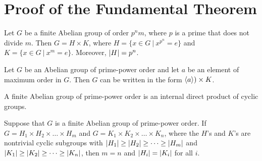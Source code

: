 \section{Proof of the Fundamental Theorem}

\begin{lemma}
	Let $G$ be a finite Abelian group of order $p^nm$, where $p$ is a prime that does not divide $m$. Then $G = H \times K$, where $H = \{x \in G\ \vert\ x^{p^n} =e\}$ and $K =\{x \in G\ \vert\ x^m = e\}$. Moreover, $\left\lvert H \right\rvert=p^n$.
\end{lemma}

\begin{lemma}
	Let $G$ be an Abelian group of prime-power order and let $a$ be an element of maximum order in $G$. Then $G$ can be written in the form $\langle a \rangle) \times K$.
\end{lemma}

\begin{lemma}
	A finite Abelian group of prime-power order is an internal direct product of cyclic groups.
\end{lemma}

\begin{lemma}
	Suppose that $G$ is a finite Abelian group of prime-power order. If $G=H_1 \times H_2 \times \dots \times H_m$ and $G=K_1 \times K_2 \times \dots \times K_n$, where the $H$'s and $K$'s are nontrivial cyclic subgroups with $\left\lvert H_1 \right\rvert \geq \left\lvert H_2 \right\rvert \geq \dots \geq \left\lvert H_m \right\rvert$ and $\left\lvert K_1 \right\rvert \geq \left\lvert K_2 \right\rvert \geq \dots \geq \left\lvert K_n \right\rvert$, then $m=n$ and $\left\lvert H_i \right\rvert = \left\lvert K_i \right\rvert$ for all $i$.
\end{lemma}
